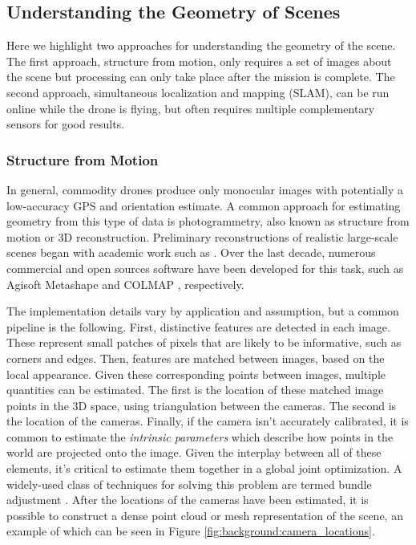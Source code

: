 \subsection{Understanding the Geometry of Scenes}
Here we highlight two approaches for understanding the geometry of the scene. The first approach, structure from motion, only requires a set of images about the scene but processing can only take place after the mission is complete. The second approach, simultaneous localization and mapping (SLAM), can be run online while the drone is flying, but often requires multiple complementary sensors for good results.
\subsubsection{Structure from Motion}
In general, commodity drones produce only monocular images with potentially a low-accuracy GPS and orientation estimate. A common approach for estimating geometry from this type of data is photogrammetry, also known as structure from motion or 3D reconstruction. Preliminary reconstructions of realistic large-scale scenes began with academic work such as \cite{Agarwal2009}. Over the last decade, numerous commercial and open sources software have been developed for this task, such as Agisoft Metashape \cite{AgisoftMetashape} and COLMAP \cite{schoenberger2016mvs, schoenberger2016sfm}, respectively.

The implementation details vary by application and assumption, but a common pipeline is the following. First, distinctive features are detected in each image. These represent small patches of pixels that are likely to be informative, such as corners and edges. Then, features are matched between images, based on the local appearance. 
Given these corresponding points between images, multiple quantities can be estimated. The first is the location of these matched image points in the 3D space, using triangulation between the cameras. The second is the location of the cameras. Finally, if the camera isn't accurately calibrated, it is common to estimate the \textit{intrinsic parameters} which describe how points in the world are projected onto the image. Given the interplay between all of these elements, it's critical to estimate them together in a global joint optimization. A widely-used class of techniques for solving this problem are termed bundle adjustment \cite{Triggs2000BundleSynthesis}. After the locations of the cameras have been estimated, it is possible to construct a dense point cloud or mesh representation of the scene, an example of which can be seen in Figure \ref{fig:background:camera_locations}.

